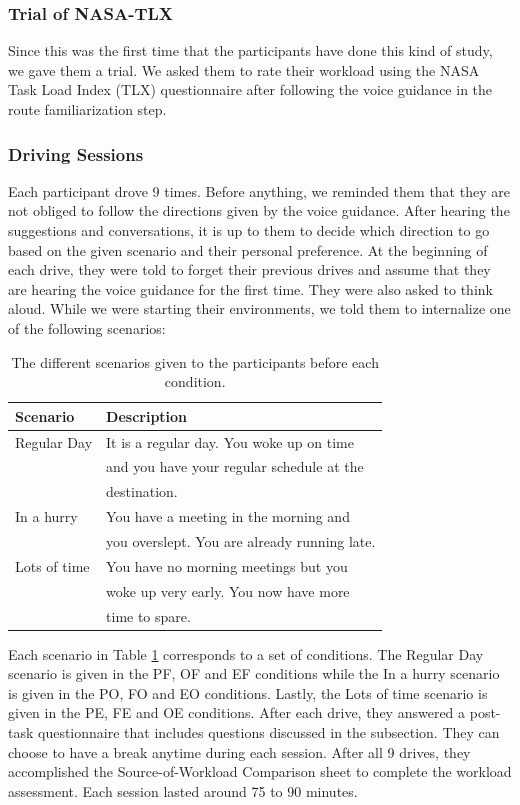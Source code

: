 \subsubsection{Trial of NASA-TLX} 
Since this was the first time that the participants have done this kind of study, we gave them a trial. We asked them to rate their workload using the NASA Task Load Index (TLX) questionnaire after following the voice guidance in the route familiarization step. 

\subsubsection{Driving Sessions} 
Each participant drove 9 times. Before anything, we reminded them that they are not obliged to follow the directions given by the voice guidance. After hearing the suggestions and conversations, it is up to them to decide which direction to go based on the given scenario and their personal preference. At the beginning of each drive, they were told to forget their previous drives and assume that they are hearing the voice guidance for the first time. They were also asked to think aloud. While we were starting their environments, we told them to internalize one of the following scenarios: 

\begin{table}[h]
	\centering
	\caption{The different scenarios given to the participants before each condition.}
	\begin{tabular}{l l}
		\toprule
		\textbf{Scenario} & \textbf{Description} \\
		\midrule
		Regular Day & It is a regular day. You woke up on time \\
		& and you have your regular schedule at the \\
		& destination. \\
		In a hurry & You have a meeting in the morning and \\
		& you overslept. You are already running late. \\
		Lots of time & You have no morning meetings but you \\
		& woke up very early. You now have more\\
		& time to spare. \\
		\bottomrule
	\end{tabular}
	\label{tab:scenario}
\end{table}

Each scenario in Table \ref{tab:scenario} corresponds to a set of conditions. The Regular Day scenario is given in the PF, OF and EF conditions while the In a hurry scenario is given in the PO, FO and EO conditions. Lastly, the Lots of time scenario is given in the PE, FE and OE conditions. After each drive, they answered a post-task questionnaire that includes questions discussed in the  subsection. They can choose to have a break anytime during each session. After all 9 drives, they accomplished the Source-of-Workload Comparison sheet to complete the workload assessment. Each session lasted around 75 to 90 minutes.

